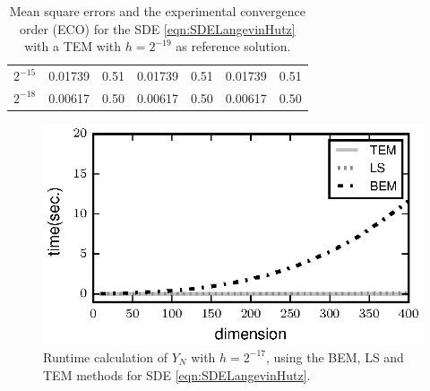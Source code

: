 \documentclass[sort&compress, preprint]{elsarticle}
\theoremstyle{definition}
\theoremstyle{plain}%
\theoremstyle{remark}
\newcommand{\SM}{LS\xspace}
\begin{document}
\begin{table}[t]
\begin{tabular}{lllllll}
		$2^{-15}$	& \num{0.01739}  & \num{0.51} & \num{0.01739}  & \num{0.51} & \num{0.01739}& 
		\num{0.51} \\
		$2^{-18}$ 	& \num{0.00617} & \num{0.50} & \num{0.00617} & \num{0.50} & 
		\num{0.00617}&\num{0.50} \\
		\bottomrule
	\end{tabular}
	\caption{
		Mean square errors and the experimental convergence order (ECO) for the SDE \eqref{eqn:SDELangevinHutz} with 
		a TEM with $h = 2^{-19}$ as reference solution.
	}\label{tbl:OrdersLS}
\end{table}
\begin{figure}[t]
	\centering
	\includegraphics{TimeVsDimension}
	\caption{
		Runtime calculation of $Y_N$ with $h=2^{-17}$, using the BEM,  \SM and TEM methods for 
		SDE \eqref{eqn:SDELangevinHutz}.
	}
	\label{fig:TimeVsDimension}
\end{figure}
\end{document}
